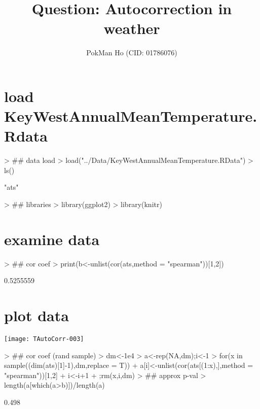 \documentclass{article}
\title{Question: Autocorrection in weather}
\author{PokMan Ho (CID: 01786076)}
\date{}
\begin{document}


\maketitle
\section{load \textbf{KeyWestAnnualMeanTemperature.Rdata}}
\begin{Schunk}
\begin{Sinput}
> ## data load
> load("../Data/KeyWestAnnualMeanTemperature.RData")
> ls()
\end{Sinput}
\begin{Soutput}
[1] "ats"
\end{Soutput}
\begin{Sinput}
> ## libraries
> library(ggplot2)
> library(knitr)
\end{Sinput}
\end{Schunk}

\section{examine data}
\begin{Schunk}
\begin{Sinput}
> ## cor coef
> print(b<-unlist(cor(ats,method = "spearman"))[1,2])
\end{Sinput}
\begin{Soutput}
[1] 0.5255559
\end{Soutput}
\end{Schunk}

\section{plot data}
\texttt{[image: TAutoCorr-003]}

\begin{Schunk}
\begin{Sinput}
> ## cor coef (rand sample)
> dm<-1e4
> a<-rep(NA,dm);i<-1
> for(x in sample((dim(ats)[1]-1),dm,replace = T)){
+   a[i]<-unlist(cor(ats[(1:x),],method = "spearman"))[1,2]
+   i<-i+1
+   };rm(x,i,dm)
> ## approx p-val
> length(a[which(a>b)])/length(a)
\end{Sinput}
\begin{Soutput}
[1] 0.498
\end{Soutput}
\end{Schunk}
\end{document}
